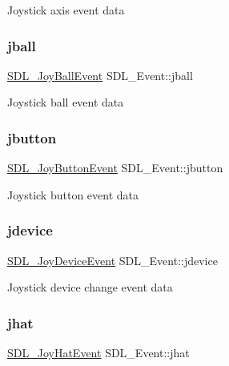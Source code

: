 Joystick axis event data \mbox{\label{union_s_d_l___event_ae433f511e3383d17f8fe02df745ee8f8}} 
\subsubsection{\texorpdfstring{jball}{jball}}
{\footnotesize\ttfamily \mbox{\hyperlink{struct_s_d_l___joy_ball_event}{S\+D\+L\+\_\+\+Joy\+Ball\+Event}} S\+D\+L\+\_\+\+Event\+::jball}

Joystick ball event data \mbox{\label{union_s_d_l___event_a591104d64903ae1cf70874fb5d3124ff}} 
\subsubsection{\texorpdfstring{jbutton}{jbutton}}
{\footnotesize\ttfamily \mbox{\hyperlink{struct_s_d_l___joy_button_event}{S\+D\+L\+\_\+\+Joy\+Button\+Event}} S\+D\+L\+\_\+\+Event\+::jbutton}

Joystick button event data \mbox{\label{union_s_d_l___event_a17514dc19a846ea1b5fbe44123700c4c}} 
\subsubsection{\texorpdfstring{jdevice}{jdevice}}
{\footnotesize\ttfamily \mbox{\hyperlink{struct_s_d_l___joy_device_event}{S\+D\+L\+\_\+\+Joy\+Device\+Event}} S\+D\+L\+\_\+\+Event\+::jdevice}

Joystick device change event data \mbox{\label{union_s_d_l___event_a421b40e0f8e01f181c8d5548cff1dd1d}} 
\subsubsection{\texorpdfstring{jhat}{jhat}}
{\footnotesize\ttfamily \mbox{\hyperlink{struct_s_d_l___joy_hat_event}{S\+D\+L\+\_\+\+Joy\+Hat\+Event}} S\+D\+L\+\_\+\+Event\+::jhat}

